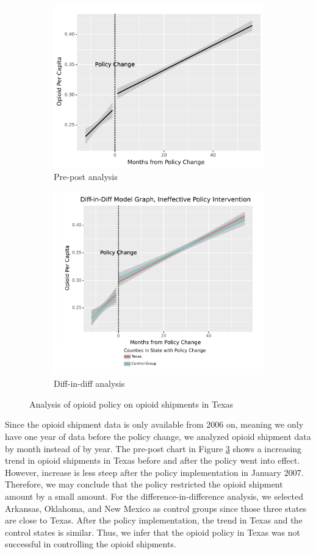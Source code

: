 \documentclass[12pt,letterpaper]{article}
\begin{document}
\begin{figure}[!h]
\centering
\begin{subfigure}{.5\textwidth}
  \centering
  \includegraphics[width=0.7\linewidth]{../30_results/Bonus_Results/tx_monthly_prepost_successful.png}
  \caption{Pre-post analysis}
  \label{fig:tx_ship_prepost}
\end{subfigure}%
\begin{subfigure}{.55\textwidth}
  \centering
  \includegraphics[width=0.7\linewidth]{../30_results/Bonus_Results/tx_monthly_did_notsure.png}
  \caption{Diff-in-diff analysis}
  \label{fig:tx_ship_did}
\end{subfigure}
\caption{Analysis of opioid policy on opioid shipments in Texas}
\label{fig:tx_ship}
\end{figure}
Since the opioid shipment data is only available from 2006 on, meaning we only have one year of data before the policy change, we analyzed opioid shipment data by month instead of by year. The pre-post chart in Figure \ref{fig:tx_ship} shows a increasing trend in opioid shipments in Texas before and after the policy went into effect. However, increase is less steep after the policy implementation in January 2007. Therefore, we may conclude that the policy restricted the opioid shipment amount by a small amount. For the difference-in-difference analysis, we selected Arkansas, Oklahoma, and New Mexico as control groups since those three states are close to Texas. After the policy implementation, the trend in Texas and the control states is similar. Thus, we infer that the opioid policy in Texas was not successful in controlling the opioid shipments. \\
\end{document}
